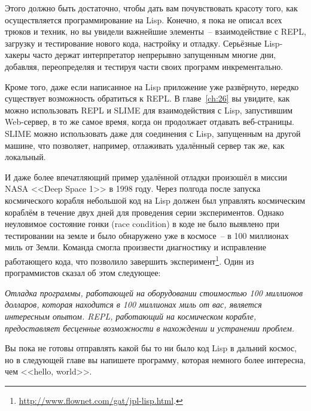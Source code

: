 Этого должно быть достаточно, чтобы дать вам почувствовать красоту того, как
осуществляется программирование на Lisp. Конечно, я пока не описал всех трюков и техник,
но вы увидели важнейшие элементы~-- взаимодействие с REPL, загрузку и тестирование нового
кода, настройку и отладку. Серьёзные Lisp-хакеры часто держат интерпретатор непрерывно
запущенным многие дни, добавляя, переопределяя и тестируя части своих программ
инкрементально.

Кроме того, даже если написанное на Lisp приложение уже развёрнуто, нередко существует
возможность обратиться к REPL. В главе~\ref{ch:26} вы увидите, как можно использовать REPL
и SLIME для взаимодействия с Lisp, запустившим Web-сервер, в то же самое время, когда он
продолжает отдавать веб-страницы. SLIME можно использовать даже для соединения с Lisp,
запущенным на другой машине, что позволяет, например, отлаживать удалённый сервер так же,
как локальный.

И даже более впечатляющий пример удалённой отладки произошёл в миссии NASA <<Deep Space 1>>
в 1998 году. Через полгода после запуска космического корабля небольшой код на Lisp
должен был управлять космическим кораблём в течение двух дней для проведения серии
экспериментов. Однако неуловимое состояние гонки (race condition) в коде не было выявлено
при тестировании на земле и было обнаружено уже в космосе~-- в 100 миллионах миль от Земли.
Команда смогла произвести диагностику и исправление работающего кода, что позволило завершить
эксперимент\footnote{\url{http://www.flownet.com/gat/jpl-lisp.html}.}. Один из
программистов сказал об этом следующее:

\emph{Отладка программы, работающей на оборудовании стоимостью 100 миллионов долларов, которая
находится в 100 миллионах миль от вас, является интересным опытом. REPL, работающий на
космическом корабле, предоставляет бесценные возможности в нахождении и устранении
проблем.}

Вы пока не готовы отправлять какой бы то ни было код Lisp в дальний космос, но в следующей
главе вы напишете программу, которая немного более интересна, чем <<hello, world>>.

